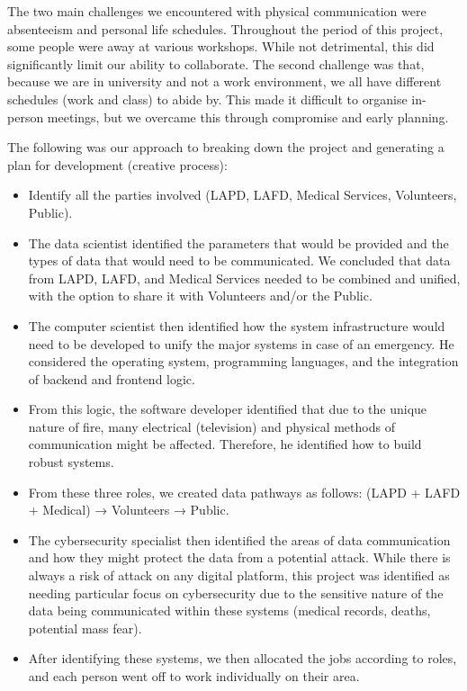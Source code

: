 \documentclass[a4paper, 11pt]{report}
\begin{document}
The two main challenges we encountered with physical communication were absenteeism and personal life schedules. Throughout the period of this project, some people were away at various workshops. While not detrimental, this did significantly limit our ability to collaborate. The second challenge was that, because we are in university and not a work environment, we all have different schedules (work and class) to abide by. This made it difficult to organise in-person meetings, but we overcame this through compromise and early planning.

The following was our approach to breaking down the project and generating a plan for development (creative process):
\begin{itemize}
\item Identify all the parties involved (LAPD, LAFD, Medical Services, Volunteers, Public).
\item The data scientist identified the parameters that would be provided and the types of data that would need to be communicated. We concluded that data from LAPD, LAFD, and Medical Services needed to be combined and unified, with the option to share it with Volunteers and/or the Public.
\item The computer scientist then identified how the system infrastructure would need to be developed to unify the major systems in case of an emergency. He considered the operating system, programming languages, and the integration of backend and frontend logic.
\item From this logic, the software developer identified that due to the unique nature of fire, many electrical (television) and physical methods of communication might be affected. Therefore, he identified how to build robust systems.
\item From these three roles, we created data pathways as follows: (LAPD + LAFD + Medical) → Volunteers → Public.
\item The cybersecurity specialist then identified the areas of data communication and how they might protect the data from a potential attack. While there is always a risk of attack on any digital platform, this project was identified as needing particular focus on cybersecurity due to the sensitive nature of the data being communicated within these systems (medical records, deaths, potential mass fear).
\item After identifying these systems, we then allocated the jobs according to roles, and each person went off to work individually on their area.
\end{itemize}
\end{document}
